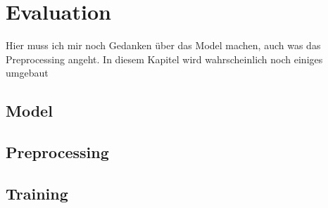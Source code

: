 
\chapter{Evaluation} %

\label{Evaluation} %
\begin{text}
Hier muss ich mir noch Gedanken über das Model machen, auch was das Preprocessing angeht. In diesem Kapitel wird wahrscheinlich noch einiges umgebaut
\end{text}
\section{Model}

\section{Preprocessing}

\section{Training}
